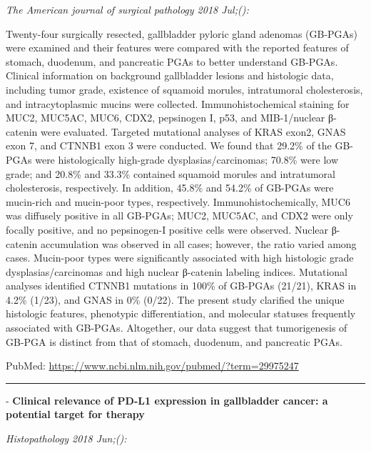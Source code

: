 \documentclass[]{article}
\begin{document}
\emph{The American journal of surgical pathology 2018 Jul;():}

Twenty-four surgically resected, gallbladder pyloric gland adenomas
(GB-PGAs) were examined and their features were compared with the
reported features of stomach, duodenum, and pancreatic PGAs to better
understand GB-PGAs. Clinical information on background gallbladder
lesions and histologic data, including tumor grade, existence of
squamoid morules, intratumoral cholesterosis, and intracytoplasmic
mucins were collected. Immunohistochemical staining for MUC2, MUC5AC,
MUC6, CDX2, pepsinogen I, p53, and MIB-1/nuclear β-catenin were
evaluated. Targeted mutational analyses of KRAS exon2, GNAS exon 7, and
CTNNB1 exon 3 were conducted. We found that 29.2\% of the GB-PGAs were
histologically high-grade dysplasias/carcinomas; 70.8\% were low grade;
and 20.8\% and 33.3\% contained squamoid morules and intratumoral
cholesterosis, respectively. In addition, 45.8\% and 54.2\% of GB-PGAs
were mucin-rich and mucin-poor types, respectively.
Immunohistochemically, MUC6 was diffusely positive in all GB-PGAs; MUC2,
MUC5AC, and CDX2 were only focally positive, and no pepsinogen-I
positive cells were observed. Nuclear β-catenin accumulation was
observed in all cases; however, the ratio varied among cases. Mucin-poor
types were significantly associated with high histologic grade
dysplasias/carcinomas and high nuclear β-catenin labeling indices.
Mutational analyses identified CTNNB1 mutations in 100\% of GB-PGAs
(21/21), KRAS in 4.2\% (1/23), and GNAS in 0\% (0/22). The present study
clarified the unique histologic features, phenotypic differentiation,
and molecular statuses frequently associated with GB-PGAs. Altogether,
our data suggest that tumorigenesis of GB-PGA is distinct from that of
stomach, duodenum, and pancreatic PGAs.

PubMed: \url{https://www.ncbi.nlm.nih.gov/pubmed/?term=29975247}

{}

{}

\begin{center}\rule{0.5\linewidth}{\linethickness}\end{center}

 - \textbf{Clinical relevance of PD-L1 expression in gallbladder cancer:
a potential target for therapy}

\emph{Histopathology 2018 Jun;():}
\end{document}
